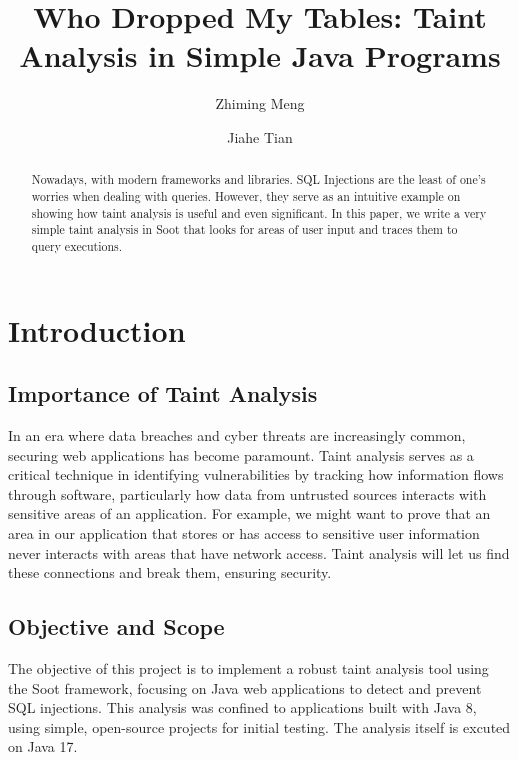 \documentclass[acmsmall]{acmart}
\begin{document}
\title{Who Dropped My Tables: Taint Analysis in Simple Java Programs}

\author{Zhiming Meng}

\author{Jiahe Tian}

\begin{abstract}
  Nowadays, with modern frameworks and libraries. SQL Injections are the least of one's worries when dealing with queries. However, they serve as an intuitive example on showing how taint analysis is useful and even significant. In this paper, we write a very simple taint analysis in Soot that looks for areas of user input and traces them to query executions.
\end{abstract}

\maketitle

\section{Introduction}
\subsection{Importance of Taint Analysis}
In an era where data breaches and cyber threats are increasingly common, securing web applications has become paramount. Taint analysis serves as a critical technique in identifying vulnerabilities by tracking how information flows through software, particularly how data from untrusted sources interacts with sensitive areas of an application. For example, we might want to prove that an area in our application that stores or has access to sensitive user information never interacts with areas that have network access. Taint analysis will let us find these connections and break them, ensuring security.

\subsection{Objective and Scope}
The objective of this project is to implement a robust taint analysis tool using the Soot framework, focusing on Java web applications to detect and prevent SQL injections. This analysis was confined to applications built with Java 8, using simple, open-source projects for initial testing. The analysis itself is excuted on Java 17.
\end{document}
